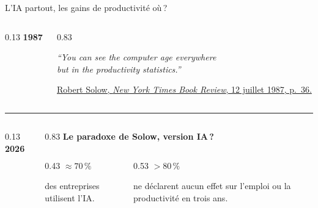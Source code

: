 \documentclass[aspectratio=169]{beamer}
\begin{document}

\begin{frame}[t]{L'IA partout, les gains de productivité où\,?}
   \begin{columns}[T,onlytextwidth]
      \begin{column}{0.13\textwidth}
         {\Large\bfseries\color{HECgreen}1987}
      \end{column}
      \begin{column}{0.83\textwidth}
         \RaggedRight
         {\large\itshape\color{HECnavy}“You can see the computer age everywhere\\but in the productivity statistics.”\par}
         \par\smallskip
         {\scriptsize\href{https://www.standupeconomist.com/pdf/misc/solow-computer-productivity.pdf}{Robert Solow, \textit{New York Times Book Review}, 12 juillet 1987, p.\ 36.}\par}
      \end{column}
   \end{columns}
   \par\vspace{0.2cm}
   {\color{HECgray!30}\rule{\textwidth}{0.4pt}}
   \par\vspace{0.2cm}
   \begin{columns}[T,onlytextwidth]
      \begin{column}{0.13\textwidth}
         {\Large\bfseries\color{HECgreen}2026}
      \end{column}
      \begin{column}{0.83\textwidth}
         \small\RaggedRight
         \textbf{Le paradoxe de Solow, version IA\,?}
         \par\smallskip
         \begin{columns}[T,onlytextwidth]
            \begin{column}{0.43\textwidth}
               \RaggedRight
               {\LARGE\bfseries\color{HECnavy}$\approx 70\,\%$}\par\smallskip
               des entreprises utilisent l'IA.
            \end{column}
            \begin{column}{0.53\textwidth}
               \RaggedRight
               {\LARGE\bfseries\color{HECcoral}$> 80\,\%$}\par\smallskip
               ne déclarent aucun effet sur l'emploi ou la productivité en trois ans.

\end{column}
\end{columns}
\end{column}
\end{columns}
\end{frame}
\end{document}
